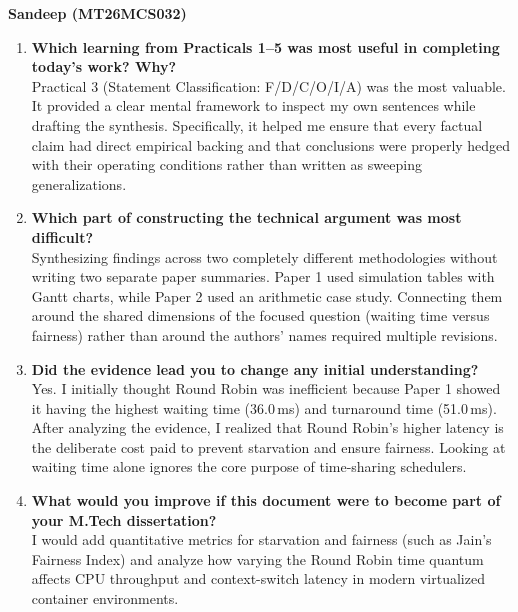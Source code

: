 \documentclass[11pt]{article}
\begin{document}
{\centering\fontsize{14}{20}\selectfont\textbf{Sandeep (MT26MCS032)}\par}
\vspace{1em}

\begin{enumerate}
    \item \textbf{Which learning from Practicals 1--5 was most useful in completing today's work? Why?} \\
    Practical 3 (Statement Classification: F/D/C/O/I/A) was the most valuable. It provided a clear mental framework to inspect my own sentences while drafting the synthesis. Specifically, it helped me ensure that every factual claim had direct empirical backing and that conclusions were properly hedged with their operating conditions rather than written as sweeping generalizations.

    \item \textbf{Which part of constructing the technical argument was most difficult?} \\
    Synthesizing findings across two completely different methodologies without writing two separate paper summaries. Paper 1 used simulation tables with Gantt charts, while Paper 2 used an arithmetic case study. Connecting them around the shared dimensions of the focused question (waiting time versus fairness) rather than around the authors' names required multiple revisions.

    \item \textbf{Did the evidence lead you to change any initial understanding?} \\
    Yes. I initially thought Round Robin was inefficient because Paper 1 showed it having the highest waiting time (36.0\,ms) and turnaround time (51.0\,ms). After analyzing the evidence, I realized that Round Robin's higher latency is the deliberate cost paid to prevent starvation and ensure fairness. Looking at waiting time alone ignores the core purpose of time-sharing schedulers.

    \item \textbf{What would you improve if this document were to become part of your M.Tech dissertation?} \\
    I would add quantitative metrics for starvation and fairness (such as Jain's Fairness Index) and analyze how varying the Round Robin time quantum affects CPU throughput and context-switch latency in modern virtualized container environments.
\end{enumerate}
\end{document}
